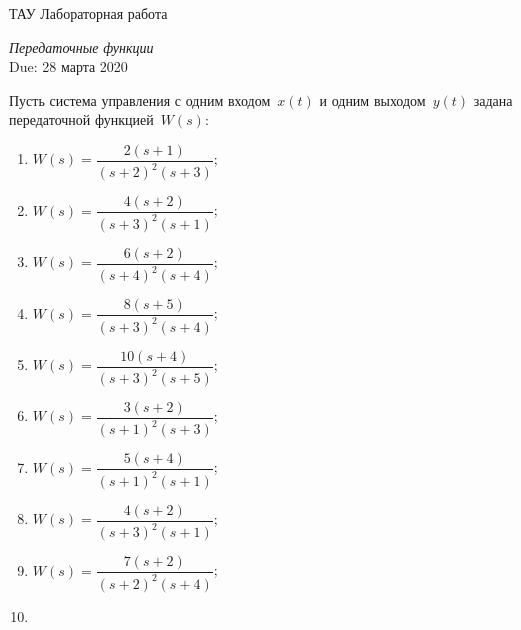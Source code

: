 \documentclass[a4paper,oneside,10pt]{book}
\theoremstyle{definition}
\begin{document}
\begin{center}
{\large  ТАУ \hspace{0.1cm} Лабораторная работа }

\vspace{5pt}
\textit{\large Передаточные функции}\\ %
\vspace{10pt}
Due: 28 марта 2020 %
\end{center}

\vspace{0.2 cm}



Пусть система управления с одним входом~$ x(t) $ и одним выходом~$ y(t) $ задана  передаточной функцией~$ W(s) $:

\begin{multicols}{2}
	\begin{enumerate}
		\item
		
		$ 	W(s) = 
		\dfrac{2(s+1)}
		{(s+2)^2(s+3)} $;
		\item 
		
		$ 	W(s) = 
		\dfrac{4(s+2)}
		{(s+3)^2(s+1)} $;
		
		\item 
		
		$ 		W(s) = 
		\dfrac{6(s+2)}
		{(s+4)^2(s+4)} $;
		
		\item
		
		$ 	W(s) = 
		\dfrac{8(s+5)}
		{(s+3)^2(s+4)} $;
		
		\item 
		
		$ 	W(s) = 
		\dfrac{10(s+4)}
		{(s+3)^2(s+5)} $;
		
		\item
		
		$ 	W(s) = 
		\dfrac{3(s+2)}
		{(s+1)^2(s+3)} $;
		
		\item
		
		$ W(s) = 
		\dfrac{5(s+4)}
		{(s+1)^2(s+1)} $;
		\item
		
		$ W(s) = 
		\dfrac{4(s+2)}
		{(s+3)^2(s+1)} $;
		
		\item 
		
		$ W(s) = 
		\dfrac{7(s+2)}
		{(s+2)^2(s+4)} $;
		
		\item 
		

\end{enumerate}
\end{multicols}
\end{document}
